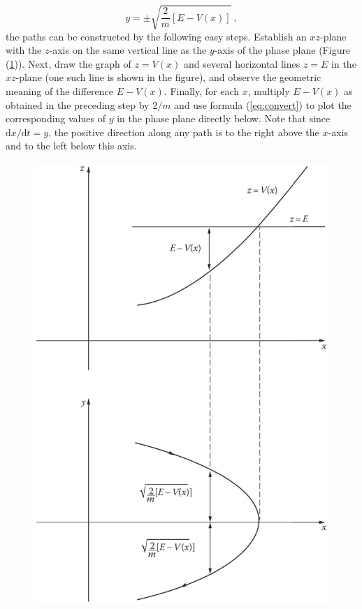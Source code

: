 \documentclass[12pt,a4paper]{article}
\newcommand{\dif}{\mathrm{d}}
\begin{document}
\begin{equation}
y = \pm \sqrt{\dfrac{2}{m} [E - V(x)]} ~,
\label{eq:convert}
\end{equation}
the paths can be constructed by the following easy steps. Establish an $xz$-plane with the $z$-axis on the same vertical line as the $y$-axis of the phase plane (Figure (\ref{fig:nonlinear_conser})). Next, draw the graph of $z=V(x)$ and several horizontal lines $z=E$ in the $xz$-plane (one such line is shown in the figure), and observe the geometric meaning of the difference $E - V(x)$. Finally, for each $x$, multiply $E - V(x)$ as obtained in the preceding step by $2/m$ and use formula (\ref{eq:convert}) to plot the corresponding values of $y$ in the phase plane directly below. Note that since $\dif x/\dif t=y$, the positive direction along any path is to the right above the $x$-axis and to the left below this axis.


\begin{figure}
\centering
\includegraphics[height=14.cm, angle=0]{nonlinear_conser.eps}
\caption{
}
\label{fig:nonlinear_conser}
\end{figure}
\end{document}
